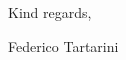 \documentclass[a4paper, 10pt]{letter}
\begin{document}
\begin{letter}
\begin{enumerate}
        \end{enumerate}

        Kind regards,

        \vspace*{5px}

        Federico Tartarini

    \end{letter}
\end{document}
